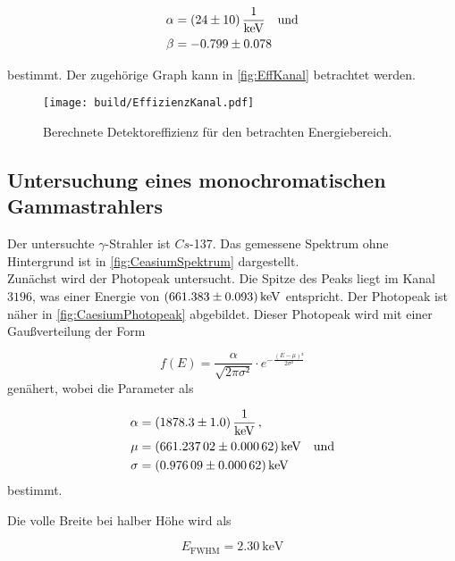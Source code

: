\begin{align*}
    \alpha &= \SI{24 \pm 10}{\frac{1}{\kilo\eV}} \quad  \text{und} \\
    \beta  &= \num{-0.799 \pm 0.078}\\
\end{align*}
%

bestimmt.
Der zugehörige Graph kann in \autoref{fig:EffKanal} betrachtet werden.


\begin{figure}[H]
    \centering
    \texttt{[image: build/EffizienzKanal.pdf]}
    \caption{Berechnete Detektoreffizienz für den betrachten Energiebereich.}
    \label{fig:EffKanal}
\end{figure}

\subsection{Untersuchung eines monochromatischen Gammastrahlers}

Der untersuchte $\gamma$-Strahler ist $Cs$-137.
Das gemessene Spektrum ohne Hintergrund ist in \autoref{fig:CeasiumSpektrum} dargestellt.\\
Zunächst wird der Photopeak untersucht.
Die Spitze des Peaks liegt im Kanal $3196$, was einer Energie von $\SI{661.383 \pm 0.093}{\kilo\eV}$ entspricht.
Der Photopeak ist näher in \autoref{fig:CaesiumPhotopeak} abgebildet.
Dieser Photopeak wird mit einer Gaußverteilung der Form

\begin{equation*}
    f(E) = \frac{\alpha}{\sqrt{2 \pi \sigma²}} \cdot e^{-\frac{(E-\mu)²}{2 \sigma²}}
\end{equation*}
genähert, wobei die Parameter als 

\begin{align*}
    \alpha  &= \SI{1878.3 \pm 1.0}{\frac{1}{\kilo\eV}} \,, \\
    \mu     &= \SI{661.23702 \pm 0.00062}{\kilo\eV}   \quad  \text{und}             \\
    \sigma  &= \SI{0.97609 \pm 0.00062}{\kilo\eV}\\
\end{align*}
bestimmt.

Die volle Breite bei halber Höhe wird als

\begin{equation*}
    E_{\text{FWHM}} =  \SI{2.30}{\kilo\eV}
\end{equation*}

